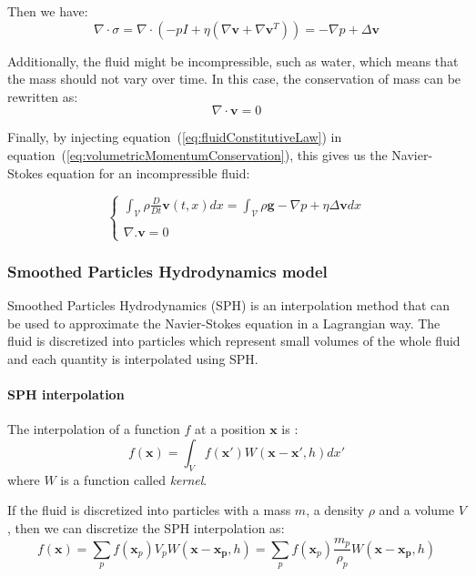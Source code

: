 Then we have:
\begin{equation}
\nabla \cdot \sigma = \nabla \cdot \left( -pI + \eta \left( \nabla \mathbf{v} + \nabla \mathbf{v}^{T} \right) \right) = -\nabla p + \Delta \mathbf{v}
\end{equation}

Additionally, the fluid might be incompressible, such as water, which means that the mass should not vary over time. In this case, the conservation of mass can be rewritten as:
\begin{equation}
\nabla \cdot \mathbf{v} = 0
\end{equation}

Finally, by injecting equation~(\ref{eq:fluidConstitutiveLaw}) in equation~(\ref{eq:volumetricMomentumConservation}), this gives us the Navier-Stokes equation for an incompressible fluid:

\begin{equation}
\left\lbrace
\begin{array}{ll}
\displaystyle
\int_{\mathcal{V}} \rho \frac{D}{Dt} \mathbf{v}(t,x) dx = 
\int_{\mathcal{V}} \rho \mathbf{g} -\nabla p + \eta \Delta \mathbf{v} dx \\ \\
\displaystyle
\nabla. \mathbf{v} = 0
\end{array}
\right.
\end{equation}

\subsubsection{Smoothed Particles Hydrodynamics model}
\label{subsubsec:starSPH}
Smoothed Particles Hydrodynamics (SPH) is an interpolation method that can be used to approximate the Navier-Stokes equation in a Lagrangian way. The fluid is discretized into particles which represent small volumes of the whole fluid and each quantity is interpolated using SPH.

\paragraph{SPH interpolation}
The interpolation of a function $f$ at a position $\mathbf{x}$ is :
\begin{equation}
f(\mathbf{x}) = \int_{V} f(\mathbf{x'})W(\mathbf{x}-\mathbf{x'}, h)dx'
\end{equation}
where $W$ is a function called \emph{kernel}. 

If the fluid is discretized into particles with a mass $m$, a density $\rho$ and a volume $V$, then we can discretize the SPH interpolation as:
\begin{equation}
f(\mathbf{x}) = \sum_{p} f(\mathbf{x}_{p})V_{p} W(\mathbf{x}-\mathbf{x_{p}},h) = \sum_{p} f(\mathbf{x}_{p})\frac{m_{p}}{\rho_{p}} W(\mathbf{x}-\mathbf{x_{p}},h)
\end{equation}

